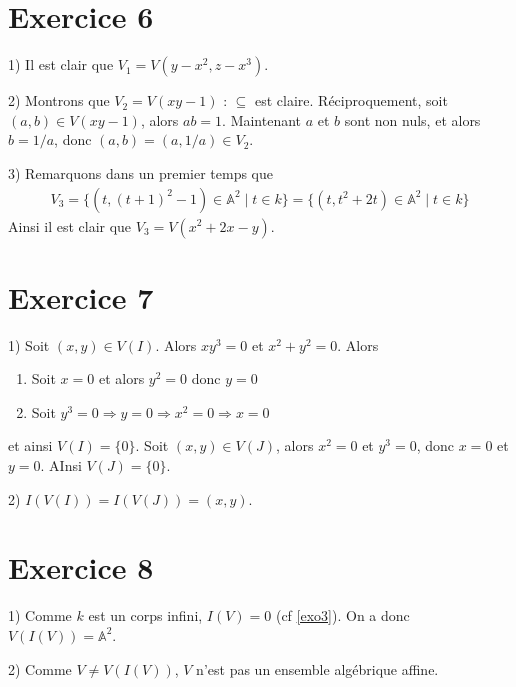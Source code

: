     \section{Exercice 6}
        \begin{question}{1)}
            Il est clair que $V_1 = V(y - x^2, z - x^3)$.
        \end{question}
        \begin{question}{2)}
            Montrons que $V_2 = V(xy - 1)$ : $\subseteq$ est claire. Réciproquement, soit $(a,b) \in V(xy - 1)$, alors $ab = 1$. Maintenant $a$ et $b$ sont non nuls, et alors $b = 1/a$, donc $(a,b) = (a, 1/a) \in V_2$.
        \end{question}
        \begin{question}{3)}
            Remarquons dans un premier temps que
            \begin{align*}
                V_3 = \{(t, (t+1)^2 - 1) \in \mathbb{A}^2 \mid t \in k\} = \{(t, t^2 + 2t)\in \mathbb{A}^2 \mid t \in k\}
            \end{align*}
            Ainsi il est clair que $V_3 = V(x^2 + 2x - y)$.
        \end{question}

    \section{Exercice 7}
        \begin{question}{1)}
            Soit $(x,y) \in V(I)$. Alors $xy^3 = 0$ et $x^2 + y^2 = 0$. Alors
            \begin{enumerate}
                \item Soit $x = 0$ et alors $y^2 = 0$ donc $y = 0$
                \item Soit $y^3 = 0 \Rightarrow y = 0 \Rightarrow x^2 = 0 \Rightarrow x = 0$
            \end{enumerate}
            et ainsi $V(I) = \{0\}$. Soit $(x,y) \in V(J)$, alors $x^2 = 0$ et $y^3 = 0$, donc $x = 0$ et $y = 0$. AInsi $V(J) = \{0\}$.
        \end{question}
        \begin{question}{2)}
            $I(V(I)) = I(V(J)) = (x,y)$.
        \end{question}

    \section{Exercice 8}
        \begin{question}{1)}
            Comme $k$ est un corps infini, $I(V) = 0$ (cf \ref{exo3}). On a donc $V(I(V)) = \mathbb{A}^2$.
        \end{question}
        \begin{question}{2)}
            Comme $V \neq V(I(V))$, $V$ n'est pas un ensemble algébrique affine.
        \end{question}

